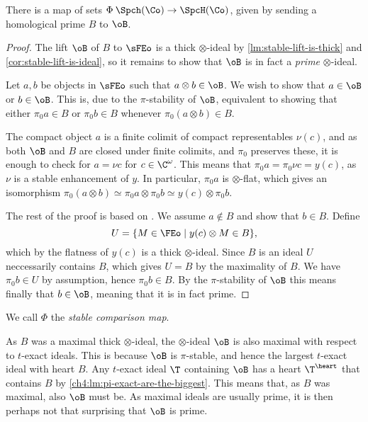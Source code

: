 \begin{theorem}
    \label{thm:existence-of-Phi}
    There is a map of sets $\Phi\: \Spch(\Co)\to \SpcH(\Co)$, given by sending a homological prime $B$ to $\oB$.
\end{theorem}
\begin{proof}
    The lift $\oB$ of $B$ to $\sFEo$ is a thick $\otimes$-ideal by \cref{lm:stable-lift-is-thick} and \cref{cor:stable-lift-is-ideal}, so it remains to show that $\oB$ is in fact a \emph{prime} $\otimes$-ideal. 

    Let $a, b$ be objects in $\sFEo$ such that $a\otimes b\in \oB$. We wish to show that $a\in \oB$ or $b\in \oB$. This is, due to the $\pi$-stability of $\oB$, equivalent to showing that either $\pi_0 a \in B$ or $\pi_0 b \in B$ whenever $\pi_0(a\otimes b) \in B$. 
    
    The compact object $a$ is a finite colimit of compact representables $\nu (c)$, and as both $\oB$ and $B$ are closed under finite colimits, and $\pi_0$ preserves these, it is enough to check for $a = \nu c$ for $c\in \C^\omega$. This means that $\pi_0 a = \pi_0 \nu c = y(c)$, as $\nu$ is a stable enhancement of $y$. In particular, $\pi_0 a$ is $\otimes$-flat, which gives an isomorphism $\pi_0 (a\otimes b) \simeq \pi_0 a \otimes \pi_0 b \simeq y(c) \otimes \pi_0 b$. 
    
    The rest of the proof is based on \cite[3.3]{balmer_2019}. We assume $a \not\in B$ and show that $b \in B$. Define
    \[U = \{M \in \FEo \mid y(c) \otimes M \in B\},\]
    which by the flatness of $y(c)$ is a thick $\otimes$-ideal. Since $B$ is an ideal $U$ neccessarily contains $B$, which gives $U=B$ by the maximality of $B$. We have $\pi_0 b \in U$ by assumption, hence $\pi_0 b \in B$. By the $\pi$-stability of $\oB$ this means finally that $b\in \oB$, meaning that it is in fact prime. 
\end{proof}

\begin{definition}
    We call $\Phi$ the \emph{stable comparison map}. 
\end{definition}

\begin{remark}
    \label{rm:t-spectrum}
    As $B$ was a maximal thick $\otimes$-ideal, the $\otimes$-ideal $\oB$ is also maximal with respect to $t$-exact ideals. This is because $\oB$ is $\pi$-stable, and hence the largest $t$-exact ideal with heart $B$. Any $t$-exact ideal $\T$ containing $\oB$ has a heart $\T^\heart$ that contains $B$ by \cref{ch4:lm:pi-exact-are-the-biggest}. This means that, as $B$ was maximal, also $\oB$ must be. As maximal ideals are usually prime, it is then perhaps not that surprising that $\oB$ is prime. 
\end{remark}

